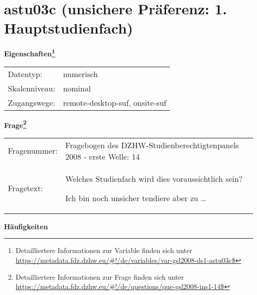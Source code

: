
    \setcounter{footnote}{0}

    \vspace*{-1.8cm}
	\section{astu03c (unsichere Präferenz: 1. Hauptstudienfach)}
	\label{section:astu03c}



    \vspace*{0.5cm}
    \noindent\textbf{Eigenschaften\footnote{Detailliertere Informationen zur Variable finden sich unter
		\url{https://metadata.fdz.dzhw.eu/\#!/de/variables/var-gsl2008-ds1-astu03c$}}}\\
	\begin{tabularx}{\hsize}{@{}lX}
	Datentyp: & numerisch \\
	Skalenniveau: & nominal \\
	Zugangswege: &
	  remote-desktop-suf, 
	  onsite-suf
 \\
    \end{tabularx}



				\vspace*{0.5cm}
                \noindent\textbf{Frage\footnote{Detailliertere Informationen zur Frage finden sich unter
		              \url{https://metadata.fdz.dzhw.eu/\#!/de/questions/que-gsl2008-ins1-14$}}}\\
				\begin{tabularx}{\hsize}{@{}lX}
					Fragenummer: &
					  Fragebogen des DZHW-Studienberechtigtenpanels 2008 - erste Welle:
					  14
 \\
					Fragetext: & Welches Studienfach wird dies voraussichtlich sein?\par  Ich bin noch unsicher tendiere aber zu … \\
				\end{tabularx}





        		\vspace*{0.5cm}
                \noindent\textbf{Häufigkeiten}

